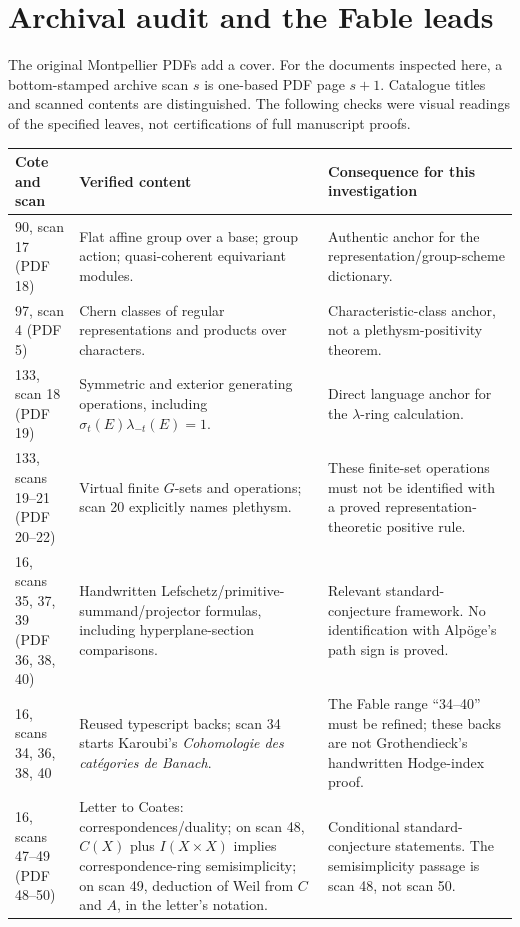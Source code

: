\section{Archival audit and the Fable leads}\label{sec:archive}
The original Montpellier PDFs add a cover. For the documents inspected here, a bottom-stamped archive scan $s$ is one-based PDF page $s+1$. Catalogue titles and scanned contents are distinguished. The following checks were visual readings of the specified leaves, not certifications of full manuscript proofs.

{\small\begin{longtable}{p{.19\linewidth}p{.36\linewidth}p{.37\linewidth}}
\toprule Cote and scan&Verified content&Consequence for this investigation\\\midrule\endhead
90, scan 17 (PDF 18)&Flat affine group over a base; group action; quasi-coherent equivariant modules.&Authentic anchor for the representation/group-scheme dictionary.\\
97, scan 4 (PDF 5)&Chern classes of regular representations and products over characters.&Characteristic-class anchor, not a plethysm-positivity theorem.\\
133, scan 18 (PDF 19)&Symmetric and exterior generating operations, including $\sigma_t(E)\lambda_{-t}(E)=1$.&Direct language anchor for the $\lambda$-ring calculation.\\
133, scans 19--21 (PDF 20--22)&Virtual finite $G$-sets and operations; scan 20 explicitly names plethysm.&These finite-set operations must not be identified with a proved representation-theoretic positive rule.\\
16, scans 35, 37, 39 (PDF 36, 38, 40)&Handwritten Lefschetz/primitive-summand/projector formulas, including hyperplane-section comparisons.&Relevant standard-conjecture framework. No identification with Alp\"oge's path sign is proved.\\
16, scans 34, 36, 38, 40&Reused typescript backs; scan 34 starts Karoubi's \emph{Cohomologie des cat\'egories de Banach}.&The Fable range ``34--40'' must be refined; these backs are not Grothendieck's handwritten Hodge-index proof.\\
16, scans 47--49 (PDF 48--50)&Letter to Coates: correspondences/duality; on scan 48, $C(X)$ plus $I(X\times X)$ implies correspondence-ring semisimplicity; on scan 49, deduction of Weil from $C$ and $A$, in the letter's notation.&Conditional standard-conjecture statements. The semisimplicity passage is scan 48, not scan 50.\\

\end{longtable}}
